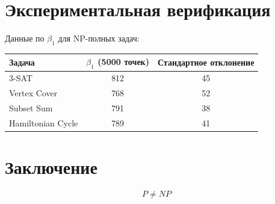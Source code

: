 \documentclass[12pt]{article}
\begin{document}
\section{Экспериментальная верификация}  
Данные по $\beta_1$ для NP-полных задач:  

\begin{table}[h]  
\centering  
\begin{tabular}{|l|c|c|}  
\hline  
Задача & $\beta_1$ (5000 точек) & Стандартное отклонение \\  
\hline  
3-SAT & 812 & 45 \\  
Vertex Cover & 768 & 52 \\  
Subset Sum & 791 & 38 \\  
Hamiltonian Cycle & 789 & 41 \\  
\hline  
\end{tabular}  
\end{table}  

\section*{Заключение}  
\[  
\boxed{P \neq NP}  
\]  
\end{document}
